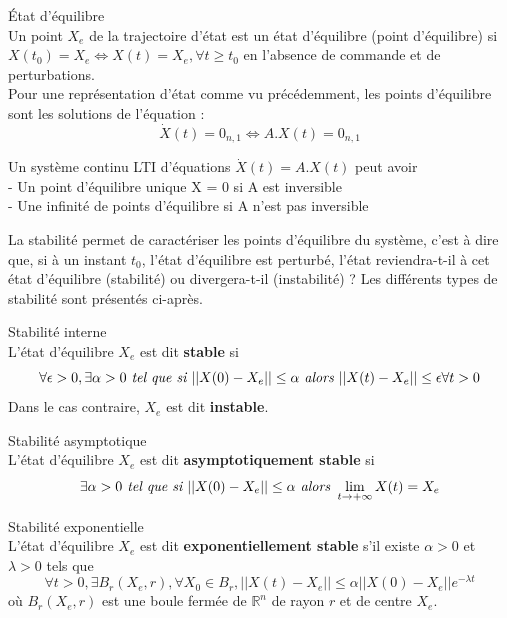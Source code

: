 \begin{definition} État d'équilibre\\
	\label{defEtatEq}
	Un point $X_e$ de la trajectoire d'état est un état d'équilibre (point d'équilibre) si $X(t_0) = X_e \Leftrightarrow X(t) = X_e, \forall t \geq t_0$ en l'absence de commande et de perturbations.\\
	Pour une représentation d'état comme vu précédemment, les points d'équilibre sont les solutions de l'équation : 
	\[\dot{X}(t) = 0_{n,1} \Leftrightarrow A.X(t) = 0_{n,1}\]
\end{definition}


\begin{theo}
	\label{theoAinversible}
	Un système continu LTI d'équations $\dot{X}(t) = A.X(t)$ peut avoir\\
	- Un point d'équilibre unique X = 0 si A est inversible\\
	- Une infinité de points d'équilibre si A n'est pas inversible	
\end{theo}

La stabilité permet de caractériser les points d'équilibre du système, c'est à dire que, si à un instant $t_0$, l'état d'équilibre est perturbé, l'état reviendra-t-il à cet état d'équilibre (stabilité) ou divergera-t-il (instabilité) ? Les différents types de stabilité sont présentés ci-après.

\begin{definition} Stabilité interne\\
	\label{defInterne}
	L'état d'équilibre $X_e$ est dit \textbf{stable} si
	\[ \forall \epsilon > 0, \exists\alpha > 0 \emph{ tel que si } ||X(0) - X_e|| \leq \alpha \emph{ alors } ||X(t) - X_e|| \leq \epsilon \forall t > 0\]	
	Dans le cas contraire, $X_e$ est dit \textbf{instable}.
\end{definition}

\begin{definition} Stabilité asymptotique\\
	\label{defAsymp}
	L'état d'équilibre $X_e$ est dit \textbf{asymptotiquement stable} si
	\[ \exists\alpha > 0 \emph{ tel que si } ||X(0) - X_e|| \leq \alpha \emph{ alors } \lim\limits_{t \rightarrow +\infty} X(t) = X_e \]
\end{definition}

\begin{definition} Stabilité exponentielle\\
	\label{defExpo}
	L'état d'équilibre $X_e$ est dit \textbf{exponentiellement stable} s'il existe $\alpha > 0$ et $\lambda > 0$ tels que 
	\[ \forall t > 0, \exists B_r(X_e,r), \forall X_0 \in B_r, ||X(t) - X_e|| \leq \alpha||X(0) - X_e||e^{-\lambda t} \]
	où $B_r(X_e,r)$ est une boule fermée de $\mathbb{R}^n$ de rayon $r$ et de centre $X_e$.
\end{definition}


